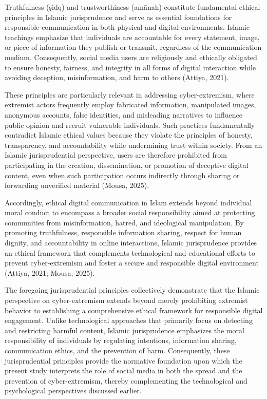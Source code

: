 \documentclass{NSP1}
\begin{document}
\par\medskip{}\smallskip

Truthfulness (ṣidq) and trustworthiness (amānah) constitute fundamental ethical principles in Islamic jurisprudence and serve as essential foundations for responsible communication in both physical and digital environments. Islamic teachings emphasize that individuals are accountable for every statement, image, or piece of information they publish or transmit, regardless of the communication medium. Consequently, social media users are religiously and ethically obligated to ensure honesty, fairness, and integrity in all forms of digital interaction while avoiding deception, misinformation, and harm to others (Attiya, 2021).

These principles are particularly relevant in addressing cyber-extremism, where extremist actors frequently employ fabricated information, manipulated images, anonymous accounts, false identities, and misleading narratives to influence public opinion and recruit vulnerable individuals. Such practices fundamentally contradict Islamic ethical values because they violate the principles of honesty, transparency, and accountability while undermining trust within society. From an Islamic jurisprudential perspective, users are therefore prohibited from participating in the creation, dissemination, or promotion of deceptive digital content, even when such participation occurs indirectly through sharing or forwarding unverified material (Mousa, 2025).

Accordingly, ethical digital communication in Islam extends beyond individual moral conduct to encompass a broader social responsibility aimed at protecting communities from misinformation, hatred, and ideological manipulation. By promoting truthfulness, responsible information sharing, respect for human dignity, and accountability in online interactions, Islamic jurisprudence provides an ethical framework that complements technological and educational efforts to prevent cyber-extremism and foster a secure and responsible digital environment (Attiya, 2021; Mousa, 2025).

The foregoing jurisprudential principles collectively demonstrate that the Islamic perspective on cyber-extremism extends beyond merely prohibiting extremist behavior to establishing a comprehensive ethical framework for responsible digital engagement. Unlike technological approaches that primarily focus on detecting and restricting harmful content, Islamic jurisprudence emphasizes the moral responsibility of individuals by regulating intentions, information sharing, communication ethics, and the prevention of harm. Consequently, these jurisprudential principles provide the normative foundation upon which the present study interprets the role of social media in both the spread and the prevention of cyber-extremism, thereby complementing the technological and psychological perspectives discussed earlier.
\end{document}
